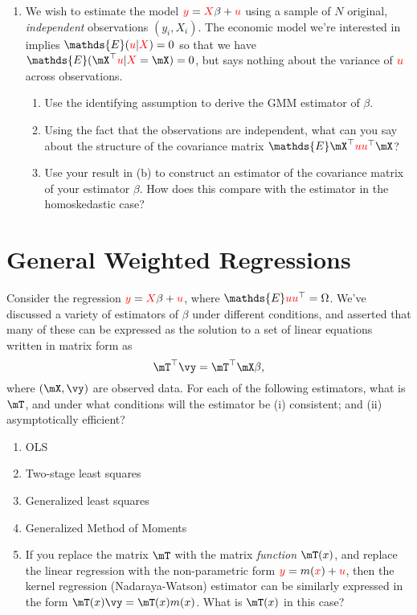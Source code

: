 \documentclass[12pt]{amsart}
\newcommand{\T}{\top}
\newcommand{\rv}[1]{\ensuremath{\textcolor{red}{#1}{}}}
\newcommand{\rvy}{\rv{y}}
\newcommand{\rvX}{\rv{X}}
\newcommand{\rvx}{\rv{x}}
\newcommand{\rvu}{\rv{u}}
\renewcommand{\E}{\ensuremath{\mathds{E}}}
\begin{document}
\begin{enumerate}
\item We wish to estimate the model \(\rvy = \rvX\beta + \rvu\) using a
sample of \(N\) original, \emph{independent} observations \((y_i,X_i)\).
The economic model we're interested in implies \(\E(\rvu|\rvX)=0\) so that
we have \(\E(\mX^\T\rvu|\rvX=\mX) = 0\), but says
nothing about the variance of \(\rvu\) across observations.
\begin{enumerate}
\item Use the identifying assumption to derive the GMM estimator of
\(\beta\).
\item Using the fact that the observations are independent, what can
you say about the structure of the covariance matrix \(\E
        \mX^\T\rvu\rvu^\T\mX\)?
\item Use your result in (b) to construct an estimator of the
covariance matrix of your estimator \(\beta\).  How does this
compare with the estimator in the homoskedastic case?
\end{enumerate}
\end{enumerate}



\section{General Weighted Regressions}
\label{sec:orgebc91b6}
Consider the regression \(\rvy = \rvX\beta + \rvu\), where \(\E\rvu\rvu^\T=\Omega\).
We've discussed a variety of estimators of \(\beta\) under different
conditions, and asserted that many of these can be expressed as the
solution to a set of linear equations written in matrix form as
\begin{equation}
   \mT^\T \vy = \mT^\T \mX\beta,
\end{equation}
where \((\mX,\vy)\) are observed data.
For each of the following estimators, what is \(\mT\), and under what
conditions will the estimator be (i) consistent; and (ii)
asymptotically efficient?
\begin{enumerate}
\item OLS
\item Two-stage least squares
\item Generalized least squares
\item Generalized Method of Moments
\item If you replace the matrix \(\mT\) with the matrix \emph{function}
\(\mT(x)\),  and replace the linear regression with the
non-parametric form \(\rvy=m(\rvx) + \rvu\), then the kernel regression
(Nadaraya-Watson) estimator can be similarly expressed in the form
\(\mT(x)\vy = \mT(x)m(x)\).  What is \(\mT(x)\) in this case?
\end{enumerate}
\end{document}
